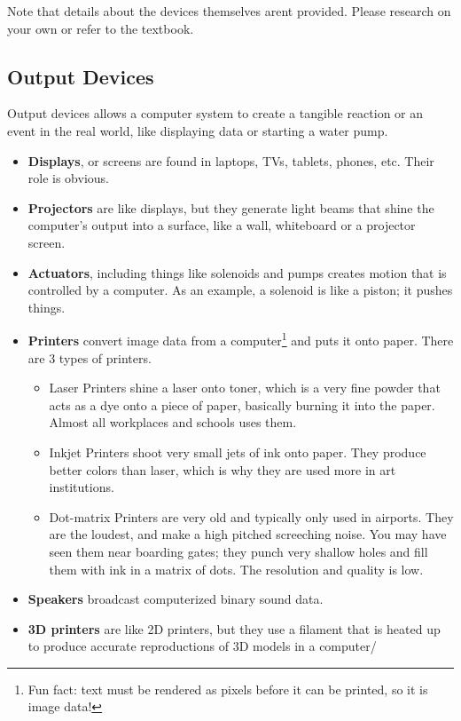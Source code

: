 \documentclass[../main.tex]{subfiles}
\begin{document}
Note that details about the devices themselves arent provided. Please research on your own or refer to the textbook.

\subsection{Output Devices}

Output devices allows a computer system to create a tangible reaction or an event in the real world, like displaying data or starting a water pump.

\begin{itemize}
    \item \textbf{Displays}, or screens are found in laptops, TVs, tablets, phones, etc. Their role is obvious. 
    \item \textbf{Projectors} are like displays, but they generate light beams that shine the computer's output into a surface, like a wall, whiteboard or a projector screen.
    \item \textbf{Actuators}, including things like solenoids and pumps creates motion that is controlled by a computer. As an example, a solenoid is like a piston; it pushes things.
    \item \textbf{Printers} convert image data from a computer\footnote{Fun fact: text must be rendered as pixels before it can be printed, so it is image data!} and puts it onto paper. There are 3 types of printers.
        \begin{itemize}
            \item Laser Printers shine a laser onto toner, which is a very fine powder that acts as a dye onto a piece of paper, basically burning it into the paper. Almost all workplaces and schools uses them.
            \item Inkjet Printers shoot very small jets of ink onto paper. They produce better colors than laser, which is why they are used more in art institutions.
            \item Dot-matrix Printers are very old and typically only used in airports. They are the loudest, and make a high pitched screeching noise. You may have seen them near boarding gates; they punch very shallow holes and fill them with ink in a matrix of dots. The resolution and quality is low.
        \end{itemize}
    \item \textbf{Speakers} broadcast computerized binary sound data.
    \item \textbf{3D printers} are like 2D printers, but they use a filament that is heated up to produce accurate reproductions of 3D models in a computer/
\end{itemize}
\end{document}
